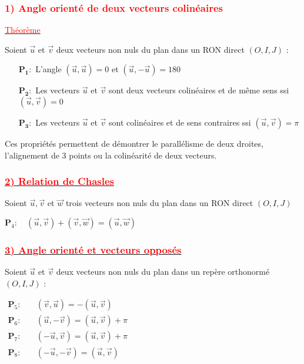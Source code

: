 \documentclass[a4paper,12pt]{article}
\begin{document}
\subsubsection*{\textcolor{red}{1) Angle orienté de deux vecteurs colinéaires}}

\underline{\textcolor{red}{Théorème}}

Soient \( \vec{u} \) et \( \vec{v} \) deux vecteurs non nuls du plan dans un RON direct \( (O, I, J) \) :

\begin{itemize}
    \item[\( \mathbf{P_1} :\)] L’angle \( (\vec{u}, \vec{u}) = 0 \) et \( (\vec{u}, -\vec{u}) = 180 \)
    \item[\( \mathbf{P_2} :\)] Les vecteurs \( \vec{u} \) et \( \vec{v} \) sont deux vecteurs colinéaires et de même sens ssi \( (\vec{u}, \vec{v}) = 0 \)
    \item[\( \mathbf{P_3} :\)] Les vecteurs \( \vec{u} \) et \( \vec{v} \) sont colinéaires et de sens contraires ssi \( (\vec{u}, \vec{v}) = \pi \)
\end{itemize}

Ces propriétés permettent de démontrer le parallélisme de deux droites, l’alignement de 3 points ou la colinéarité de deux vecteurs.

\subsubsection*{\underline{\textcolor{red}{2) Relation de Chasles}}}

Soient \( \vec{u}, \vec{v} \) et \( \vec{w} \) trois vecteurs non nuls du plan dans un RON direct \( (O, I, J) \)

\( \textbf{P}_4: \quad (\vec{u}, \vec{v}) + (\vec{v}, \vec{w}) = (\vec{u}, \vec{w}) \)

\subsubsection*{\underline{\textcolor{red}{3) Angle orienté et vecteurs opposés}}}

Soient \( \vec{u} \) et \( \vec{v} \) deux vecteurs non nuls du plan dans un repère orthonormé \( (O, I, J) \) :

\(
\begin{aligned}
\textbf{P}_5: \quad & (\vec{v}, \vec{u}) = -(\vec{u}, \vec{v})\\ 
\textbf{P}_6: \quad & (\vec{u}, -\vec{v}) = (\vec{u}, \vec{v}) + \pi \\
\textbf{P}_7: \quad & (-\vec{u}, \vec{v}) = (\vec{u}, \vec{v}) + \pi \\
\textbf{P}_8: \quad & (-\vec{u}, -\vec{v}) = (\vec{u}, \vec{v})
\end{aligned}
\)
\end{document}
